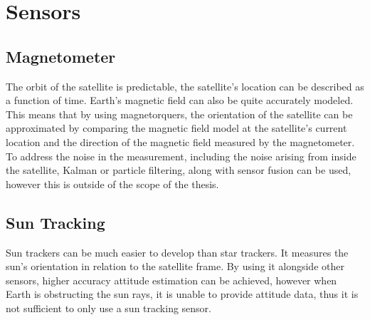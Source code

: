 \section{Sensors}


\subsection{Magnetometer}

The orbit of the satellite is predictable, the satellite's location can be described as a function of time. Earth's magnetic field can also be quite accurately modeled. This means that by using magnetorquers, the orientation of the satellite can be approximated by comparing the magnetic field model at the satellite's current location and the direction of the magnetic field measured by the magnetometer. To address the noise in the measurement, including the noise arising from inside the satellite, Kalman or particle filtering, along with sensor fusion can be used, however this is outside of the scope of the thesis.

\subsection{Sun Tracking}

Sun trackers can be much easier to develop than star trackers. It measures the sun's orientation in relation to the satellite frame. By using it alongside other sensors, higher accuracy attitude estimation can be achieved, however when Earth is obstructing the sun rays, it is unable to provide attitude data, thus it is not sufficient to only use a sun tracking sensor.